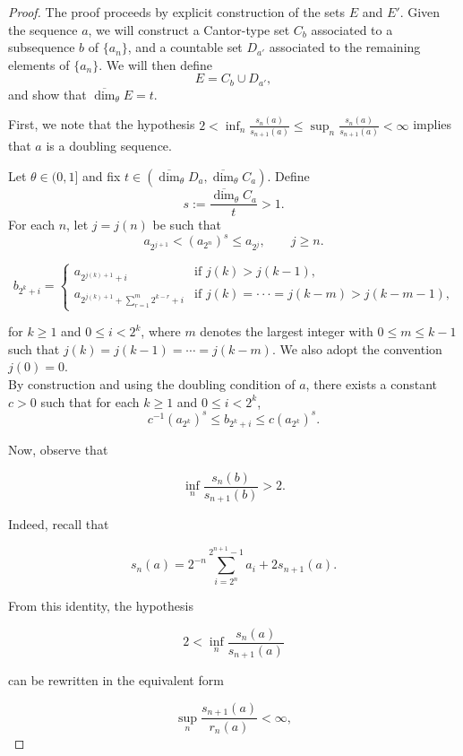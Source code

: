 \documentclass[11pt,reqno,bookmarksnumbered,raiselinks,breaklinks,colorlinks,plainpages]{amsart}
\begin{document}
\begin{proof}
The proof proceeds by explicit construction of the sets $E$ and $E'$. Given the sequence \(a\), we will construct a Cantor-type set \(C_b\) associated to a subsequence \(b\) of \(\{a_n\}\), and a countable set \(D_{a'}\) associated to the remaining elements of \(\{a_n\}\). We will then define
\[
E = C_b \cup D_{a'},
\]
and show that \( \overline{\dim}_\theta E = t\).

First, we note that the hypothesis $2<\inf_n\frac{s_n(a)}{s_{n+1}(a)}\leq \sup_n\frac{s_n(a)}{s_{n+1}(a)}<\infty $ implies that $a$ is a doubling sequence.

Let \( \theta \in (0,1] \) and fix \( t \in ( \overline{\dim}_\theta D_a , \overline{\dim}_\theta C_a) \). Define
\[
s := \frac{\overline{\dim}_\theta C_a}{t} > 1.
\]
For each \(n\), let \(j=j(n)\) be such that
\begin{equation}\label{j(n)}
    a_{2^{j+1}} < (a_{2^n})^s \leq a_{2^j}, \qquad j \geq n.
\end{equation}


\[ b_{2^k+i} = \begin{cases}                  a_{2^{j(k)+1}+i} & \text{if $j(k)>j(k-1)$,}\\                  a_{2^{j(k)+1}+\sum_{r=1}^m 2^{k-r}+i} &    \text{if $j(k)=\cdot\cdot\cdot=j(k-m)>j(k-m-1)$,}           \end{cases} \]

for \(k\ge 1\) and \(0\le i<2^k\), where \(m\) denotes the largest integer with \(0\le m\le k-1\) such that \(j(k)=j(k-1)=\cdots=j(k-m)\). 
We also adopt the convention \(j(0)=0\).\\
By construction and using the doubling condition of $a$, there exists a constant $c>0$ such that for each \(k \geq 1\) and \(0 \leq i < 2^k\),
\[
c^{-1} (a_{2^k})^s \leq b_{2^k+i} \leq c (a_{2^k})^s.
\]


Now, observe that

$$
\inf_n \frac{s_n(b)}{s_{n+1}(b)} > 2.
$$

Indeed, recall that

$$
s_n(a) = 2^{-n} \sum_{i=2^n}^{2^{n+1}-1} a_i + 2 s_{n+1}(a).
$$

From this identity, the hypothesis

$$
2 < \inf_n \frac{s_n(a)}{s_{n+1}(a)}
$$

can be rewritten in the equivalent form

$$
\sup_n \frac{s_{n+1}(a)}{r_n(a)} < \infty,
$$


\end{proof}
\end{document}
